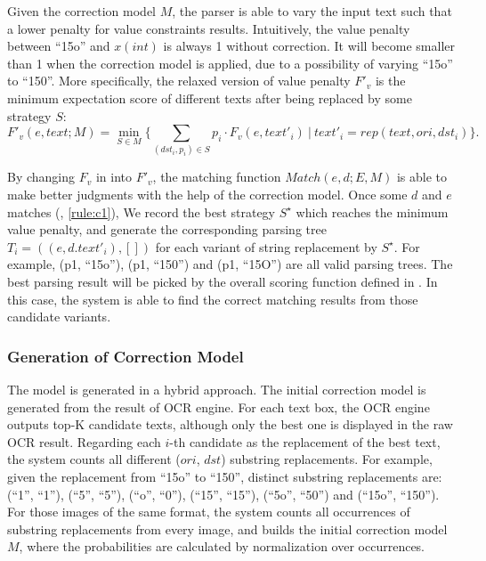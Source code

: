 Given the correction model $M$,
the parser is able to vary the input text
such that a lower penalty for value constraints results.
Intuitively, the value penalty between ``15o'' and $x(int)$
is always 1 without correction.
It will become smaller than 1 when the correction model is applied,
due to a possibility of varying ``15o'' to ``150''.
More specifically, the relaxed version of value penalty $F'_v$
is the minimum expectation score of different texts
after being replaced by some strategy $S$:
\begin{equation}
F'_v(e, text; M)=\min_{S \in M}\{
  \sum_{(dst_i, p_i) \in S} p_i \cdot F_v(e, text'_i)~ |~ text'_i=rep(text, ori, dst_i)
\}.
\end{equation}

By changing $F_v$ in  into $F'_v$,
the matching function $Match(e, d; E, M)$ is able to make better judgments
with the help of the correction model.
Once some $d$ and $e$ matches (, \ref{rule:c1}),
We record the best strategy $S^\star$ which reaches the minimum value penalty,
and generate the corresponding parsing tree $T_i = ((e, d.text'_i), [])$
for each variant of string replacement by $S^\star$.
For example, (p1, ``15o''), (p1, ``150'') and (p1, ``15O'')
are all valid parsing trees.
The best parsing result will be picked by the overall scoring function
defined in .
In this case, the system is able to find the correct matching results
from those candidate variants.


\subsubsection{Generation of Correction Model}
The model is generated in a hybrid approach.
The initial correction model is generated from the result of OCR engine.
For each text box, the OCR engine outputs top-K candidate texts, although
only the best one is displayed in the raw OCR result.
Regarding each $i$-th candidate as the replacement of the best text,
the system counts all different ($ori$, $dst$) substring replacements.
For example, given the replacement from ``15o'' to ``150'',
distinct substring replacements are:
(``1'', ``1''), (``5'', ``5''), (``o'', ``0''),
(``15'', ``15''), (``5o'', ``50'') and (``15o'', ``150'').
For those images of the same format,
the system counts all occurrences of substring replacements from every image,
and builds the initial correction model $M$,
where the probabilities are calculated by normalization over occurrences.

